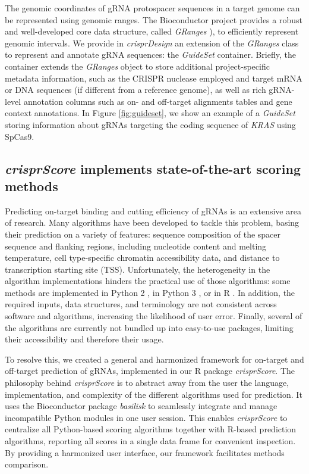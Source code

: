 \documentclass[pdftex,english,10pt]{article}
\begin{document}
The genomic coordinates of gRNA protospacer sequences in a target genome can be represented using genomic ranges.
The Bioconductor project \citep{bioc1,bioc2} provides a robust and well-developed core data structure, called \textit{GRanges} \citep{genomicranges,granges}), to efficiently represent genomic intervals. We provide in \textit{crisprDesign} an extension of the \textit{GRanges} class to represent and annotate gRNA sequences: the \textit{GuideSet} container. Briefly, the container extends the \textit{GRanges} object to store additional project-specific metadata information, such as the CRISPR nuclease employed and target mRNA or DNA sequences (if different from a reference genome), as well as rich gRNA-level annotation columns such as on- and off-target alignments tables and gene context annotations. In Figure \ref{fig:guideset},  we show an example of a \textit{GuideSet} storing information about gRNAs targeting the coding sequence of \textit{KRAS} using SpCas9. 




\subsection{\textit{crisprScore} implements state-of-the-art scoring methods}

Predicting on-target binding and cutting efficiency of gRNAs is an extensive area of research. Many algorithms have been developed to tackle this problem, basing their prediction on a variety of features: sequence composition of the spacer sequence and flanking regions, including nucleotide content and melting temperature, cell type-specific chromatin accessibility data, and distance to transcription starting site (TSS).  Unfortunately, the heterogeneity in the algorithm implementations hinders the practical use of those algorithms: some methods are implemented in Python 2 \citep{azimuth,deepcpf1,crispria, deepspcas9}, in Python 3 \citep{lindel,deepcas9,enpamgb}, or in R  \citep{doench2014rational,wessels2020massively,crisprscan,crisprater}. In addition, the required inputs, data structures, and terminology are not consistent across software and algorithms, increasing the likelihood of user error. Finally, several of the algorithms are currently not bundled up into easy-to-use packages, limiting their accessibility and therefore their usage.

To resolve this, we created a general and harmonized framework for on-target and off-target prediction of gRNAs, implemented in our R package \textit{crisprScore}. The philosophy behind \textit{crisprScore} is to abstract away from the user the language, implementation, and complexity of the different algorithms used for prediction.  It uses the Bioconductor package \textit{basilisk} \citep{basilisk} to seamlessly integrate and manage incompatible Python modules in one user session. This enables \textit{crisprScore} to centralize all Python-based scoring algorithms together with R-based prediction algorithms, reporting all scores in a single data frame for convenient inspection. By providing a harmonized user interface, our framework facilitates methods comparison. 
\end{document}
